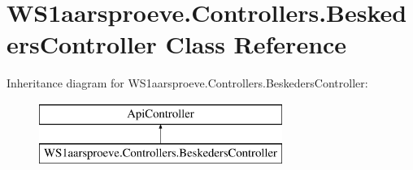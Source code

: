 \hypertarget{class_w_s1aarsproeve_1_1_controllers_1_1_beskeders_controller}{}\section{W\+S1aarsproeve.\+Controllers.\+Beskeders\+Controller Class Reference}
\label{class_w_s1aarsproeve_1_1_controllers_1_1_beskeders_controller}
Inheritance diagram for W\+S1aarsproeve.\+Controllers.\+Beskeders\+Controller\+:\begin{figure}[H]
\begin{center}
\leavevmode
\includegraphics[height=2.000000cm]{class_w_s1aarsproeve_1_1_controllers_1_1_beskeders_controller}
\end{center}
\end{figure}
